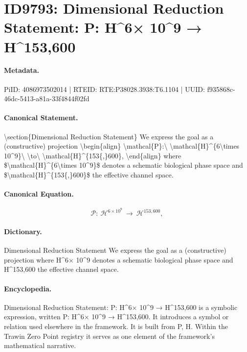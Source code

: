 \section*{ID9793: Dimensional Reduction Statement: P: H\textasciicircum{}6× 10\textasciicircum{}9 → H\textasciicircum{}153,600}
\paragraph{Metadata.}
PiID: 4086973502014 | RTEID: RTE:P38028.3938:T6.1104 | UUID: f935868c-46dc-5413-a81a-33f4844f02fd

\paragraph{Canonical Statement.}
\textbackslash{}section\{Dimensional Reduction Statement\} We express the goal as a (constructive) projection \textbackslash{}begin\{align\} \textbackslash{}mathcal\{P\}:\textbackslash{} \textbackslash{}mathcal\{H\}\textasciicircum{}\{6\textbackslash{}times 10\textasciicircum{}9\}\textbackslash{} \textbackslash{}to\textbackslash{} \textbackslash{}mathcal\{H\}\textasciicircum{}\{153\{,\}600\}, \textbackslash{}end\{align\} where \$\textbackslash{}mathcal\{H\}\textasciicircum{}\{6\textbackslash{}times 10\textasciicircum{}9\}\$ denotes a schematic biological phase space and \$\textbackslash{}mathcal\{H\}\textasciicircum{}\{153\{,\}600\}\$ the effective channel space.

\paragraph{Canonical Equation.}
\[
\mathcal{P}:\ \mathcal{H}^{6\times 10^9}\ \to\ \mathcal{H}^{153{,}600},
\]

\paragraph{Dictionary.}
Dimensional Reduction Statement We express the goal as a (constructive) projection where H\textasciicircum{}6× 10\textasciicircum{}9 denotes a schematic biological phase space and H\textasciicircum{}153,600 the effective channel space.

\paragraph{Encyclopedia.}
Dimensional Reduction Statement: P: H\textasciicircum{}6× 10\textasciicircum{}9 → H\textasciicircum{}153,600 is a symbolic expression, written P: H\textasciicircum{}6× 10\textasciicircum{}9 → H\textasciicircum{}153,600. It introduces a symbol or relation used elsewhere in the framework. It is built from P, H. Within the Trawin Zero Point registry it serves as one element of the framework's mathematical narrative.
